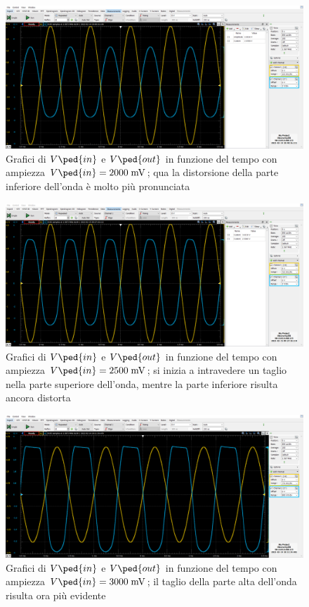 \documentclass[10pt, a4paper, italian]{article}
\begin{document}
\begin{figure}[htbp]
    \centering
	\includegraphics[scale=0.4]{amp.2000}
    \caption{Grafici di $V\ped{in}$ e $V\ped{out}$ in funzione del tempo con ampiezza $V\ped{in}=2000 \; \si{m\V}$; qua la distorsione della parte inferiore dell'onda è molto più pronunciata}
\end{figure}
\begin{figure}[htbp]
    \centering
	\includegraphics[scale=0.4]{amp.2500}
    \caption{Grafici di $V\ped{in}$ e $V\ped{out}$ in funzione del tempo con ampiezza $V\ped{in}=2500 \; \si{m\V}$; si inizia a intravedere un taglio nella parte superiore dell'onda, mentre la parte inferiore risulta ancora distorta}
\end{figure}
\begin{figure}[htbp]
    \centering
	\includegraphics[scale=0.4]{amp.3000}
    \caption{Grafici di $V\ped{in}$ e $V\ped{out}$ in funzione del tempo con ampiezza $V\ped{in}=3000 \; \si{m\V}$; il taglio della parte alta dell'onda risulta ora più evidente}
\end{figure}
\end{document}
